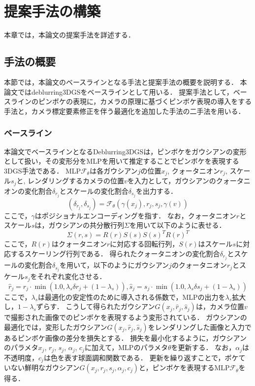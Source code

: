 \section{提案手法の構築}\label{sec:method_creation}
本章では，本論文の提案手法を詳述する．

\subsection{手法の概要}\label{subsec:method_outline}
本節では，本論文のベースラインとなる手法と提案手法の概要を説明する．
本論文ではdeblurring3DGS\cite{Deblurring3dgs}をベースラインとして用いる．
提案手法として，ベースラインのピンボケの表現に，カメラの原理に基づくピンボケ表現の導入をする手法と，カメラ標定要素修正を伴う最適化を追加した手法の二手法を用いる．
\subsubsection*{ベースライン}
本論文でベースラインとなるDeblurring3DGS\cite{Deblurring3dgs}は，ピンボケをガウシアンの変形として扱い，その変形分をMLPを用いて推定することでピンボケを表現する3DGS手法である．
MLP$\mathcal{F}_\theta$は各ガウシアン$j$の位置$x_j$, クォータニオン$r_j$, スケール$s_j$と, レンダリングするカメラの位置$v$を入力として，ガウシアンのクォータニオンの変化割合$\delta_{r_j}$とスケールの変化割合$\delta_{s_j}$を出力する．
\begin{equation}
	(\delta_{r_j}, \delta_{s_j}) = \mathcal{F}_\theta(\gamma(x_j), r_j, s_j, \gamma(v))
\end{equation}
ここで，$\gamma$はポジショナルエンコーディングを指す．
なお，クォータニオン$r$とスケール$s$は，ガウシアンの共分散行列$\Sigma$を用いて以下のように表せる．
\begin{equation}
  \Sigma(r, s) = R(r)S(s){S(s)}^T{R(r)}^T
\end{equation}
ここで，$R(r)$はクォータニオン$r$に対応する回転行列，$S(r)$はスケール$s$に対応するスケーリング行列である\cite{rotation_quaternion}．
得られたクォータニオンの変化割合$\delta_{r_j}$とスケールの変化割合$\delta_{s_j}$を用いて，以下のようにガウシアン$j$のクォータニオン$r_j$とスケール$s_j$をそれぞれ変化させる．
\begin{equation}
	\hat{r}_j=r_j \cdot \min \left(1.0, \lambda_s \delta r_j+\left(1-\lambda_s\right)\right), 
	\hat{s}_j=s_j \cdot \min \left(1.0, \lambda_s \delta s_j+\left(1-\lambda_s\right)\right)
\end{equation}
ここで，$\lambda_s$は最適化の安定性のために導入される係数で，MLPの出力を$\lambda_s$拡大し，$1-\lambda_s$ずらす．
こうして得られたガウシアン$G(x_j, \hat{r}_j, \hat{s}_j)$は，カメラ位置$v$で撮影された画像でのピンボケを表現するよう変形されている．
ガウシアンの最適化では，変形したガウシアン$G(x_j, \hat{r}_j, \hat{s}_j)$をレンダリングした画像と入力であるピンボケ画像の差分を損失とする．
損失を最小化するように，ガウシアンのパラメタ$x_j$, $r_j$, $s_j$, $\alpha_j$, $c_j$に加えて，MLPのパラメタ$\theta$を更新する．
なお，$\alpha_j$は不透明度，$c_j$は色を表す球面調和関数である．
更新を繰り返すことで，ボケていない鮮明なガウシアン$G(x_j, r_j, s_j, \alpha_j, c_j)$と，ピンボケを表現するMLP$\mathcal{F}_\theta$を得る．

